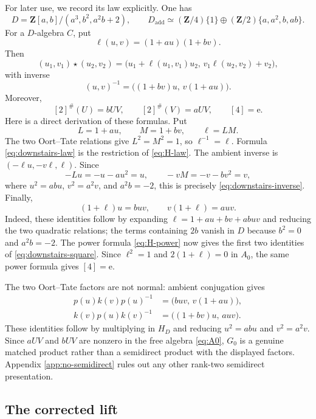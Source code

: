 \documentclass[11pt]{amsart}
\theoremstyle{remark}
\newcommand{\Z}{\mathbf Z}
\newcommand{\unit}{\mathrm e}
\begin{document}
For later use, we record its law explicitly.  One has
\[
 D=\Z[a,b]/(a^3,b^2,a^2b+2),
 \qquad
 D_{\mathrm{add}}
 \simeq
 (\Z/4)\{1\}
 \oplus
 (\Z/2)\{a,a^2,b,ab\}.
\]
For a \(D\)-algebra \(C\), put
\[
 \ell(u,v)=(1+au)(1+bv).
\]
Then
\begin{equation}\label{eq:downstairs-law}
 (u_1,v_1)\star(u_2,v_2)
 =
 \bigl(
  u_1+\ell(u_1,v_1)u_2,\,
  v_1\ell(u_2,v_2)+v_2
 \bigr),
\end{equation}
with inverse
\begin{equation}\label{eq:downstairs-inverse}
 (u,v)^{-1}
 =
 \bigl((1+bv)u,\,v(1+au)\bigr).
\end{equation}
Moreover,
\begin{equation}\label{eq:downstairs-square}
 [2]^\#(U)=bUV,
 \qquad
 [2]^\#(V)=aUV,
 \qquad
 [4]=\unit.
\end{equation}
Here is a direct derivation of these formulas.  Put
\[
 L=1+au,\qquad M=1+bv,\qquad \ell=LM.
\]
The two Oort--Tate relations give \(L^2=M^2=1\), so
\(\ell^{-1}=\ell\).  Formula \eqref{eq:downstairs-law} is the
restriction of \eqref{eq:H-law}.  The ambient inverse is
\((-\ell u,-v\ell,\ell)\).  Since
\[
 -Lu=-u-au^2=u,\qquad -vM=-v-bv^2=v,
\]
where \(u^2=abu\), \(v^2=a^2v\), and \(a^2b=-2\), this is precisely
\eqref{eq:downstairs-inverse}.  Finally,
\[
 (1+\ell)u=buv,\qquad v(1+\ell)=auv.
\]
Indeed, these identities follow by expanding \(\ell=1+au+bv+abuv\)
and reducing the two quadratic relations; the terms containing \(2b\)
vanish in \(D\) because \(b^2=0\) and \(a^2b=-2\).
The power formula \eqref{eq:H-power} now gives the first two identities
of \eqref{eq:downstairs-square}.  Since \(\ell^2=1\) and
\(2(1+\ell)=0\) in \(A_0\), the same power formula gives
\([4]=\unit\).

The two Oort--Tate factors are not normal: ambient conjugation gives
\begin{align}
 p(u)k(v)p(u)^{-1}
   &=\bigl(buv,\,v(1+au)\bigr),
   \label{eq:conj-K}\\
 k(v)p(u)k(v)^{-1}
   &=\bigl((1+bv)u,\,auv\bigr).
   \label{eq:conj-P}
\end{align}
These identities follow by multiplying in \(H_D\) and reducing
\(u^2=abu\) and \(v^2=a^2v\).
Since \(aUV\) and \(bUV\) are nonzero in the free algebra
\eqref{eq:A0}, \(G_0\) is a genuine matched product rather than a
semidirect product with the displayed factors.  Appendix
\ref{app:no-semidirect} rules out any other rank-two semidirect
presentation.
\subsection{The corrected lift}
\end{document}
